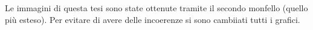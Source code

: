 Le immagini di questa tesi sono state ottenute tramite il secondo monfello (quello più esteso). Per evitare di avere delle incoerenze si sono cambiiati tutti i grafici.